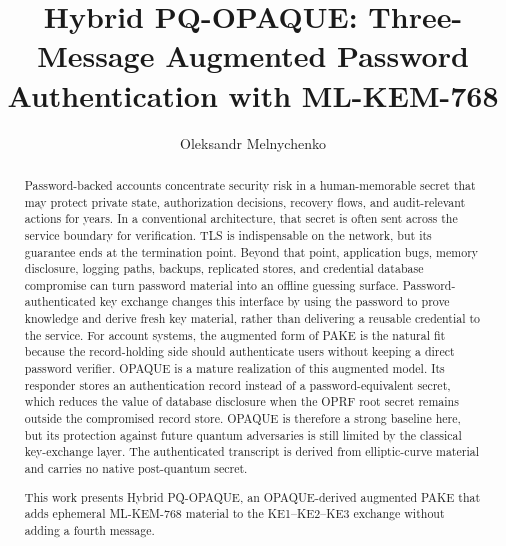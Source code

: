 \documentclass[preprint,12pt]{elsarticle}
\theoremstyle{remark}
\begin{document}

\begin{frontmatter}

\title{Hybrid PQ-OPAQUE: Three-Message Augmented Password Authentication with ML-KEM-768}

\author{Oleksandr Melnychenko}

\address{Khmelnytskyi National University, Khmelnytskyi, Ukraine}


\begin{abstract}
Password-backed accounts concentrate security risk in a human-memorable
secret that may protect private state, authorization decisions, recovery
flows, and audit-relevant actions for years. In a conventional
architecture, that secret is often sent across the service boundary for
verification. TLS is indispensable on the network, but its guarantee ends
at the termination point. Beyond that point, application bugs, memory
disclosure, logging paths, backups, replicated stores, and credential
database compromise can turn password material into an offline guessing
surface. Password-authenticated key exchange changes this interface by
using the password to prove knowledge and derive fresh key material,
rather than delivering a reusable credential to the service. For account
systems, the augmented form of PAKE is the natural fit because the
record-holding side should authenticate users without keeping a direct
password verifier. OPAQUE is a mature realization of this augmented model.
Its responder stores an authentication record instead of a
password-equivalent secret, which reduces the value of database disclosure
when the OPRF root secret remains outside the compromised record store.
OPAQUE is therefore a strong baseline here, but its
protection against future quantum adversaries is still limited by the
classical key-exchange layer. The authenticated transcript is derived from
elliptic-curve material and carries no native post-quantum secret.

This work presents Hybrid PQ-OPAQUE, an OPAQUE-derived augmented PAKE that
adds ephemeral ML-KEM-768 material to the KE1--KE2--KE3 exchange without
adding a fourth message.


\end{abstract}
\end{frontmatter}
\end{document}
